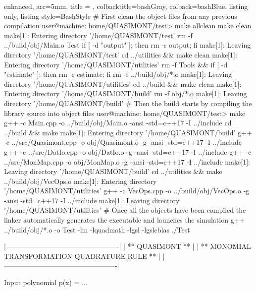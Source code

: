 \documentclass[a4paper, twosided]{book}
\begin{document}
\vspace{0.2cm}
\begin{tcblisting}{enhanced,
                   arc=5mm,
                   title = \color{black}{\large \ttfamily Compilation and Linking of the library},
                   colbacktitle=bashGray,
                   colback=bashBlue,
                   listing only,
                   listing style=BashStyle}
# First clean the object files from any previous compilation
user@machine: home/QUASIMONT/test> make allclean
make clean
make[1]: Entering directory '/home/QUASIMONT/test'
rm -f ../build/obj/Main.o Test
if [ -d "output" ]; then rm -r output; fi 
make[1]: Leaving directory '/home/QUASIMONT/test'
cd ../utilities && make clean
make[1]: Entering directory '/home/QUASIMONT/utilities'
rm -f Tools && if [ -d "estimate" ]; then rm -r estimate; fi
rm -f ../build/obj/*.o
make[1]: Leaving directory '/home/QUASIMONT/utilities'
cd ../build && make clean
make[1]: Entering directory '/home/QUASIMONT/build'
rm -f obj/*.o
make[1]: Leaving directory '/home/QUASIMONT/build'
# Then the build starts by compiling the library source into object files
user@machine: home/QUASIMONT/test> make
g++ -c Main.cpp -o ../build/obj/Main.o -ansi -std=c++17 -I ../include
cd ../build && make
make[1]: Entering directory '/home/QUASIMONT/build'
g++ -c ../src/Quasimont.cpp -o obj/Quasimont.o -g -ansi -std=c++17 -I ../include 
g++ -c ../src/DatIo.cpp -o obj/DatIo.o -g -ansi -std=c++17 -I ../include 
g++ -c ../src/MonMap.cpp -o obj/MonMap.o -g -ansi -std=c++17 -I ../include 
make[1]: Leaving directory '/home/QUASIMONT/build'
cd ../utilities && make ../build/obj/VecOps.o
make[1]: Entering directory '/home/QUASIMONT/utilities'
g++ -c VecOps.cpp -o ../build/obj/VecOps.o -g -ansi -std=c++17 -I ../include 
make[1]: Leaving directory '/home/QUASIMONT/utilities'
# Once all the objects have been compiled the linker automatically generates the executable and launches the simulation
g++ ../build/obj/*.o -o Test -lm -lquadmath -lgsl -lgslcblas
./Test

    |-------------------------------------------------|
    |                 ** QUASIMONT **                 |
    |  ** MONOMIAL TRANSFORMATION QUADRATURE RULE **  |
    |-------------------------------------------------|


 Input polynomial p(x) = ...
\end{tcblisting}
\vspace{0.3cm}
\end{document}
